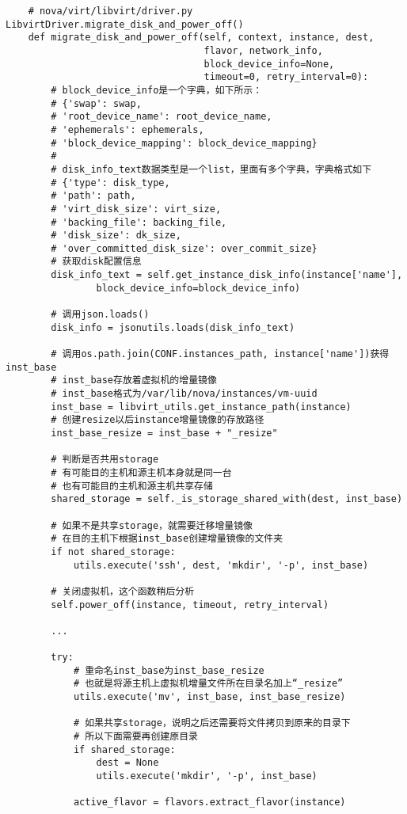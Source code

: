 \documentclass[a4paper,left=1.5cm,right=1.5cm,11pt]{article}
\begin{document}
	\begin{lstlisting}
	# nova/virt/libvirt/driver.py LibvirtDriver.migrate_disk_and_power_off()
	def migrate_disk_and_power_off(self, context, instance, dest,
                                   flavor, network_info,
                                   block_device_info=None,
                                   timeout=0, retry_interval=0):
		# block_device_info是一个字典，如下所示：
		# {'swap': swap,
		# 'root_device_name': root_device_name,
		# 'ephemerals': ephemerals,
		# 'block_device_mapping': block_device_mapping}
		# 
		# disk_info_text数据类型是一个list，里面有多个字典，字典格式如下
		# {'type': disk_type,
		# 'path': path,
		# 'virt_disk_size': virt_size,
		# 'backing_file': backing_file,
		# 'disk_size': dk_size,
		# 'over_committed_disk_size': over_commit_size}
		# 获取disk配置信息
        disk_info_text = self.get_instance_disk_info(instance['name'],
                block_device_info=block_device_info)

		# 调用json.loads()
		disk_info = jsonutils.loads(disk_info_text)

		# 调用os.path.join(CONF.instances_path, instance['name'])获得inst_base
		# inst_base存放着虚拟机的增量镜像
		# inst_base格式为/var/lib/nova/instances/vm-uuid
        inst_base = libvirt_utils.get_instance_path(instance)
		# 创建resize以后instance增量镜像的存放路径
        inst_base_resize = inst_base + "_resize"

		# 判断是否共用storage
		# 有可能目的主机和源主机本身就是同一台
		# 也有可能目的主机和源主机共享存储
        shared_storage = self._is_storage_shared_with(dest, inst_base)

		# 如果不是共享storage，就需要迁移增量镜像
		# 在目的主机下根据inst_base创建增量镜像的文件夹
        if not shared_storage:
            utils.execute('ssh', dest, 'mkdir', '-p', inst_base)

		# 关闭虚拟机，这个函数稍后分析
        self.power_off(instance, timeout, retry_interval)

		...

        try:
			# 重命名inst_base为inst_base_resize
			# 也就是将源主机上虚拟机增量文件所在目录名加上“_resize”
            utils.execute('mv', inst_base, inst_base_resize)

			# 如果共享storage，说明之后还需要将文件拷贝到原来的目录下
			# 所以下面需要再创建原目录
            if shared_storage:
                dest = None
                utils.execute('mkdir', '-p', inst_base)

            active_flavor = flavors.extract_flavor(instance)


\end{lstlisting}
\end{document}
